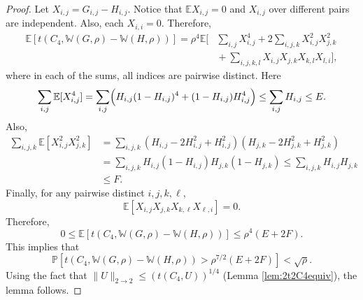 \documentclass{amsart}
\numberwithin{equation}{section}
\numberwithin{figure}{section}
\theoremstyle{definition}
\theoremstyle{remark}
\newcommand{\EE}{\mathbb{E}}
\newcommand{\PP}{\mathbb{P}}
\newcommand{\cW}{\mathbb{W}}
\begin{document}
\begin{proof}
Let $X_{i,j}=G_{i,j}-H_{i,j}$. Notice that $\EE X_{i,j}=0$ and $X_{i,j}$ over
different pairs are independent. Also, each $X_{i,i}=0$. Therefore,
\begin{align*}
\EE[t(C_4,\cW(G,\rho)-\cW(H,\rho))] =\rho^4\EE \bigg[&\sum_{i,j}
X_{i,j}^4+2\sum_{i,j,k} X_{i,j}^2X_{j,k}^2\\
& \phantom{} +
\sum_{i,j,k,l}X_{i,j}X_{j,k}X_{k,l}X_{l,i} \bigg],
\end{align*}
where in each of the
sums, all indices are pairwise distinct. Here
\[\sum_{i,j} \EE[X_{i,j}^4] =
\sum_{i,j}\Bigl( H_{i,j}(1-H_{i,j})^4+(1-H_{i,j})H_{i,j}^4 \Bigr) \le \sum_{i,j} H_{i,j}\leq E.
\]
Also,
\begin{align*}
\sum_{i,j,k} \EE \left[X_{i,j}^2X_{j,k}^2\right]&=
\sum_{i,j,k} \left(H_{i,j}-2H_{i,j}^2+H_{i,j}^2 \right)\left(H_{j,k}-2H_{j,k}^2+H_{j,k}^2 \right)\\
&=\sum_{i,j,k} H_{i,j}(1-H_{i,j})H_{j,k}(1-H_{j,k})
\le \sum_{i,j,k}H_{i,j}H_{j,k}\\
&\leq F.
\end{align*}
Finally, for any pairwise distinct $i,j,k,\ell$,
\[\EE[X_{i,j}X_{j,k}X_{k,\ell}X_{\ell,i}]=0.
\]
Therefore,
\begin{equation}
\label{EtC4-bd}
0\leq\EE[t(C_4,\cW(G,\rho)-\cW(H,\rho))]\le \rho^4 (E +2F).
\end{equation}
This implies that
\[\PP\left[t(C_4,\cW(G,\rho)-\cW(H,\rho))> \rho^{7/2}(E+2F)\right] < \sqrt{\rho}.
\]
Using the fact that $\|U\|_{2 \rightarrow 2} \le \left(t(C_4,U)\right)^{1/4}$
(Lemma \ref{lem:2t2C4equiv}), the lemma follows.
\end{proof}
\end{document}
